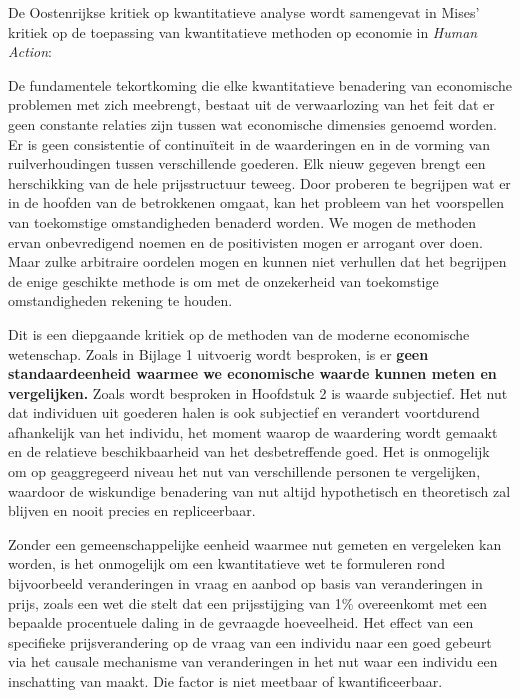 De Oostenrijkse kritiek op kwantitatieve analyse wordt samengevat in Mises’ kritiek op de toepassing van kwantitatieve methoden op economie in \textit{Human Action}:


\begin{blockquotebox}
De fundamentele tekortkoming die elke kwantitatieve benadering van economische problemen met zich meebrengt, bestaat uit de verwaarlozing van het feit dat er geen constante relaties zijn tussen wat economische dimensies genoemd worden. Er is geen consistentie of continuïteit in de waarderingen en in de vorming van ruilverhoudingen tussen verschillende goederen. Elk nieuw gegeven brengt een herschikking van de hele prijsstructuur teweeg. Door proberen te begrijpen wat er in de hoofden van de betrokkenen omgaat, kan het probleem van het voorspellen van toekomstige omstandigheden benaderd worden.  We mogen de methoden ervan onbevredigend noemen en de positivisten mogen er arrogant over doen. Maar zulke arbitraire oordelen mogen en kunnen niet verhullen dat het begrijpen de enige geschikte methode is om met de onzekerheid van toekomstige omstandigheden rekening te houden.\footnotemark
\end{blockquotebox}


Dit is een diepgaande kritiek op de methoden van de moderne economische wetenschap. Zoals in Bijlage 1 uitvoerig wordt besproken, is er \textbf{geen standaardeenheid waarmee we economische waarde kunnen meten en vergelijken.} Zoals wordt besproken in Hoofdstuk 2 is waarde subjectief. Het nut dat individuen uit goederen halen is ook subjectief en verandert voortdurend afhankelijk van het individu, het moment waarop de waardering wordt gemaakt en de relatieve beschikbaarheid van het desbetreffende goed. Het is onmogelijk om op geaggregeerd niveau het nut van verschillende personen te vergelijken, waardoor de wiskundige benadering van nut altijd hypothetisch en theoretisch zal blijven en nooit precies en repliceerbaar.

Zonder een gemeenschappelijke eenheid waarmee nut gemeten en vergeleken kan worden, is het onmogelijk om een kwantitatieve wet te formuleren rond bijvoorbeeld veranderingen in vraag en aanbod op basis van veranderingen in prijs, zoals een wet die stelt dat een prijsstijging van 1\% overeenkomt met een bepaalde procentuele daling in de gevraagde hoeveelheid. Het effect van een specifieke prijsverandering op de vraag van een individu naar een goed gebeurt via het causale mechanisme van veranderingen in het nut waar een individu een inschatting van maakt. Die factor is niet meetbaar of kwantificeerbaar.


